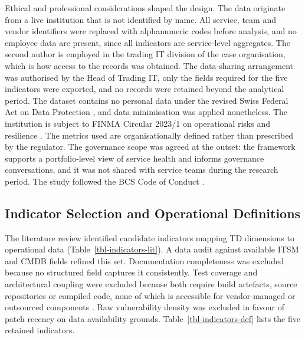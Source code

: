 \documentclass[
  authoryear,
  preprint]{elsarticle}
\begin{document}
Ethical and professional considerations shaped the design. The data
originate from a live institution that is not identified by name. All
service, team and vendor identifiers were replaced with alphanumeric
codes before analysis, and no employee data are present, since all
indicators are service-level aggregates. The second author is employed
in the trading IT division of the case organisation, which is how access
to the records was obtained. The data-sharing arrangement was authorised
by the Head of Trading IT, only the fields required for the five
indicators were exported, and no records were retained beyond the
analytical period. The dataset contains no personal data under the
revised Swiss Federal Act on Data Protection \citep{FederalActData2023},
and data minimisation was applied nonetheless. The institution is
subject to FINMA Circular 2023/1 on operational risks and resilience
\citep{finmaCircular202312024}. The metrics used are organisationally
defined rather than prescribed by the regulator. The governance scope
was agreed at the outset: the framework supports a portfolio-level view
of service health and informs governance conversations, and it was not
shared with service teams during the research period. The study followed
the BCS Code of Conduct \citep{CodeConductBCS2022}.

\subsection{Indicator Selection and Operational
Definitions}\label{sec-indicators}

The literature review identified candidate indicators mapping TD
dimensions to operational data (Table~\ref{tbl-indicators-lit}). A data
audit against available ITSM and CMDB fields refined this set.
Documentation completeness was excluded because no structured field
captures it consistently. Test coverage and architectural coupling were
excluded because both require build artefacts, source repositories or
compiled code, none of which is accessible for vendor-managed or
outsourced components
\citep{amanatidisEvaluatingAgreementTechnical2020}. Raw vulnerability
density was excluded in favour of patch recency on data availability
grounds. Table~\ref{tbl-indicators-def} lists the five retained
indicators.
\end{document}
